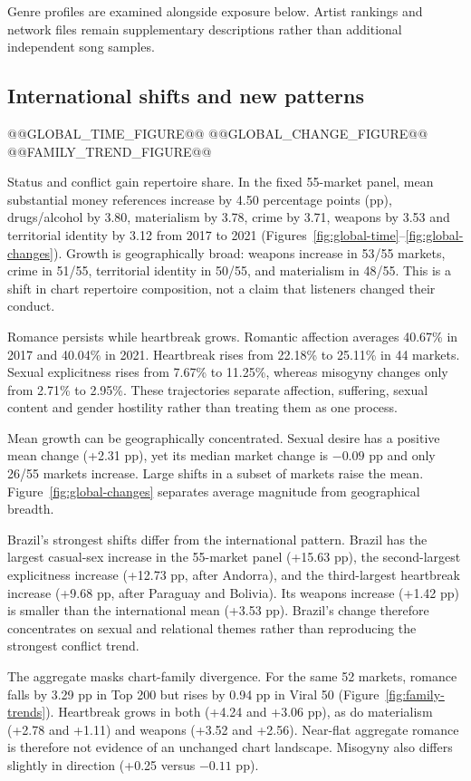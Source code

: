 \documentclass[10pt,a4paper,twocolumn]{article}
\begin{document}
Genre profiles are examined alongside exposure below. Artist rankings and network files remain supplementary descriptions rather than additional independent song samples.

\subsection{International shifts and new patterns}
@@GLOBAL_TIME_FIGURE@@
@@GLOBAL_CHANGE_FIGURE@@
@@FAMILY_TREND_FIGURE@@

Status and conflict gain repertoire share. In the fixed 55-market panel, mean substantial money references increase by 4.50 percentage points (pp), drugs/alcohol by 3.80, materialism by 3.78, crime by 3.71, weapons by 3.53 and territorial identity by 3.12 from 2017 to 2021 (Figures~\ref{fig:global-time}--\ref{fig:global-changes}). Growth is geographically broad: weapons increase in 53/55 markets, crime in 51/55, territorial identity in 50/55, and materialism in 48/55. This is a shift in chart repertoire composition, not a claim that listeners changed their conduct.

Romance persists while heartbreak grows. Romantic affection averages 40.67\% in 2017 and 40.04\% in 2021. Heartbreak rises from 22.18\% to 25.11\% in 44 markets. Sexual explicitness rises from 7.67\% to 11.25\%, whereas misogyny changes only from 2.71\% to 2.95\%. These trajectories separate affection, suffering, sexual content and gender hostility rather than treating them as one process.

Mean growth can be geographically concentrated. Sexual desire has a positive mean change (+2.31 pp), yet its median market change is $-0.09$ pp and only 26/55 markets increase. Large shifts in a subset of markets raise the mean. Figure~\ref{fig:global-changes} separates average magnitude from geographical breadth.

Brazil's strongest shifts differ from the international pattern. Brazil has the largest casual-sex increase in the 55-market panel (+15.63 pp), the second-largest explicitness increase (+12.73 pp, after Andorra), and the third-largest heartbreak increase (+9.68 pp, after Paraguay and Bolivia). Its weapons increase (+1.42 pp) is smaller than the international mean (+3.53 pp). Brazil's change therefore concentrates on sexual and relational themes rather than reproducing the strongest conflict trend.

The aggregate masks chart-family divergence. For the same 52 markets, romance falls by 3.29 pp in Top 200 but rises by 0.94 pp in Viral 50 (Figure~\ref{fig:family-trends}). Heartbreak grows in both (+4.24 and +3.06 pp), as do materialism (+2.78 and +1.11) and weapons (+3.52 and +2.56). Near-flat aggregate romance is therefore not evidence of an unchanged chart landscape. Misogyny also differs slightly in direction (+0.25 versus $-0.11$ pp).
\end{document}

